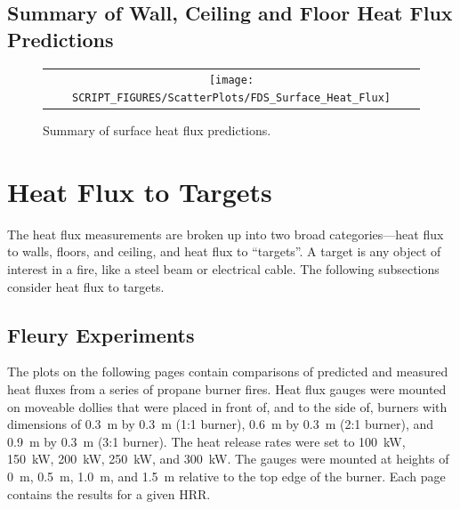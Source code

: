 \clearpage


\subsection{Summary of Wall, Ceiling and Floor Heat Flux Predictions}
\label{Surface Heat Flux}


\begin{figure}[h!]
\begin{center}
\begin{tabular}{c}
\texttt{[image: SCRIPT\_FIGURES/ScatterPlots/FDS\_Surface\_Heat\_Flux]}
\end{tabular}
\end{center}
\caption[Summary of compartment surface heat flux predictions]
{Summary of surface heat flux predictions.}
\label{Summary_Surface_Heat_Flux}
\end{figure}



\clearpage

\section{Heat Flux to Targets}

The heat flux measurements are broken up into two broad categories---heat flux to walls, floors, and ceiling, and heat flux to ``targets''. A target is any object of interest in a fire, like a steel beam or electrical cable. The following subsections consider heat flux to targets.


\subsection{Fleury Experiments}

The plots on the following pages contain comparisons of predicted and measured heat fluxes from a series of propane burner fires. Heat flux gauges were mounted on moveable dollies that were placed in front of, and to the side of, burners with dimensions of 0.3~m by 0.3~m (1:1 burner), 0.6~m by 0.3~m (2:1 burner), and 0.9~m by 0.3~m (3:1 burner). The heat release rates were set to 100~kW, 150~kW, 200~kW, 250~kW, and 300~kW. The gauges were mounted at heights of 0~m, 0.5~m, 1.0~m, and 1.5~m relative to the top edge of the burner. Each page contains the results for a given HRR.

\newpage

